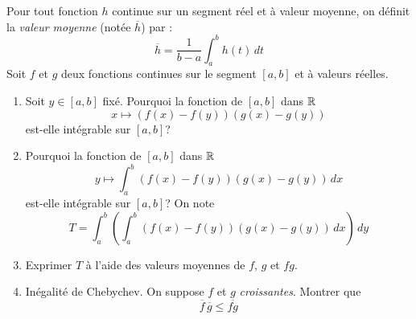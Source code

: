 Pour tout fonction $h$ continue sur un segment réel et à valeur moyenne, on définit la \emph{valeur moyenne} (notée $\overline{h}$) par :
\begin{displaymath}
 \overline{h} = \frac{1}{b-a}\int_a^bh(t)\,dt
\end{displaymath}
Soit $f$ et $g$ deux fonctions continues sur le segment $[a,b]$ et à valeurs réelles.
\begin{enumerate}
 \item Soit $y\in [a,b]$ fixé. Pourquoi la fonction de $[a,b]$ dans $\mathbb{R}$
\begin{displaymath}
 x \mapsto (f(x)-f(y))(g(x)-g(y))
\end{displaymath}
est-elle intégrable sur $[a,b]$?

 \item Pourquoi la fonction de $[a,b]$ dans $\mathbb{R}$
\begin{displaymath}
 y \mapsto \int_a^b(f(x)-f(y))(g(x)-g(y))\, dx
\end{displaymath}
est-elle intégrable sur $[a,b]$? On note
\begin{displaymath}
 T = \int_a^b\left(\int_a^b(f(x)-f(y))(g(x)-g(y))\, dx \right)\, dy 
\end{displaymath}

\item Exprimer $T$ à l'aide des valeurs moyennes de $f$, $g$ et $fg$.

\item Inégalité de Chebychev. On suppose $f$ et $g$ \emph{croissantes}. Montrer que
\begin{displaymath}
 \overline{f}\,\overline{g} \leq \overline{fg}
\end{displaymath}

\end{enumerate}
